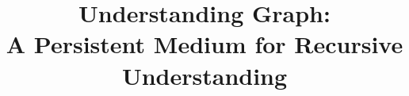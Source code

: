 

\usepackage{enumitem}
\usepackage{mathtools}
\usepackage{amsthm}
\usepackage{multirow}
\usepackage{tcolorbox}

\usepackage[capitalize,noabbrev]{cleveref}

\theoremstyle{plain}
\newtheorem{theorem}{Theorem}[section]
\newtheorem{proposition}[theorem]{Proposition}
\newtheorem{lemma}[theorem]{Lemma}
\newtheorem{corollary}[theorem]{Corollary}
\theoremstyle{definition}
\newtheorem{definition}[theorem]{Definition}
\newtheorem{assumption}[theorem]{Assumption}
\theoremstyle{remark}
\newtheorem{remark}[theorem]{Remark}

\title{Understanding Graph:\\A Persistent Medium for Recursive Understanding}


\raggedbottom

\maketitle

